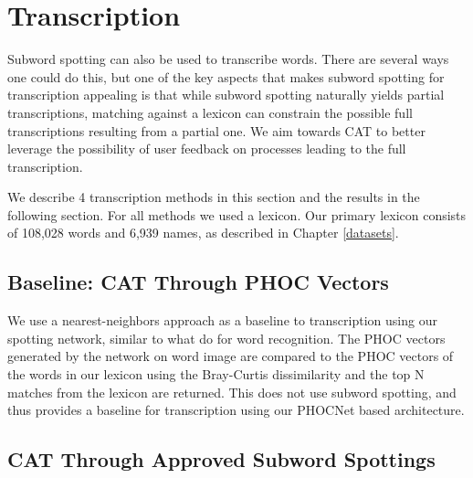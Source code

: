\documentclass[ms,electronic,twosidetoc,letterpaper,chaptercenter,parttop,lol,lof,lot]{byumsphd}
\begin{document}
\section{Transcription}

Subword spotting can also be used to transcribe words. There are several ways one could do this, but one of the key aspects that makes subword spotting for transcription appealing is that while subword spotting naturally yields partial transcriptions, matching against a lexicon can constrain the possible full transcriptions resulting from a partial one. We aim towards CAT to better leverage the possibility of user feedback on processes leading to the full transcription.

We describe 4 transcription methods in this section and the results in the following section.
For all methods we used a lexicon. Our primary lexicon consists of 108,028 words and 6,939 names, as described in Chapter \ref{datasets}.

\subsection{Baseline: CAT Through PHOC Vectors}

We use a nearest-neighbors approach as a baseline to transcription using our spotting network, similar to what \cite{krishnan2016} do for word recognition. The PHOC vectors generated by the network on word image are compared to the PHOC vectors of the  words in our lexicon using the Bray-Curtis dissimilarity and the top N matches from the lexicon are returned. This does not use subword spotting, and thus provides a baseline for transcription using our PHOCNet based architecture.







\subsection{CAT Through Approved Subword Spottings}
\end{document}
